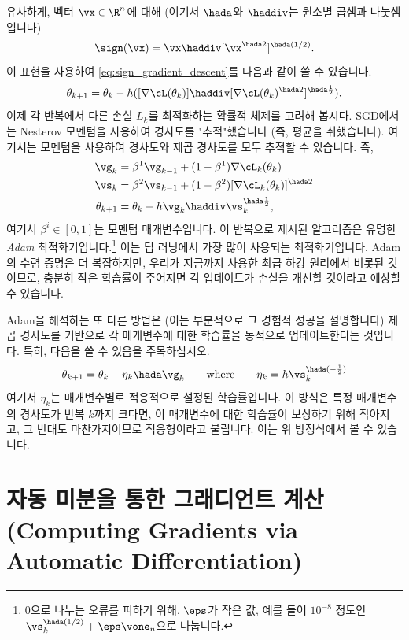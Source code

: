 \documentclass[../../book-main_ko.tex]{subfiles}
\begin{document}
유사하게, 벡터 \(\vx \in \R^{n}\)에 대해 (여기서 \(\hada\)와 \(\haddiv\)는 원소별 곱셈과 나눗셈입니다)
\begin{equation}
    \sign(\vx) = \vx \haddiv [\vx^{\hada 2}]^{\hada (1/2)}.
\end{equation}
이 표현을 사용하여 \eqref{eq:sign_gradient_descent}를 다음과 같이 쓸 수 있습니다.
\begin{equation}
    \theta_{k + 1} = \theta_{k} - h ([\nabla \cL(\theta_{k})] \haddiv [\nabla
    \cL(\theta_{k})^{\hada 2}]^{\hada \frac{1}{2}}).
\end{equation}
이제 각 반복에서 다른 손실 \(L_{k}\)를 최적화하는 확률적 체제를 고려해 봅시다. SGD에서는 Nesterov 모멘텀을 사용하여 경사도를 "추적"했습니다 (즉, 평균을 취했습니다). 여기서는 모멘텀을 사용하여 경사도와 제곱 경사도를 모두 추적할 수 있습니다. 즉,
\begin{align}
    \vg_{k}
    &= \beta^{1}\vg_{k - 1} + (1 - \beta^{1})\nabla \cL_{k}(\theta_{k}) \\ 
    \vs_{k}
    &= \beta^{2}\vs_{k - 1} + (1 - \beta^{2})[\nabla \cL_{k}(\theta_{k})]^{\hada 2}  \\
    \theta_{k + 1}
    &= \theta_{k} - h\vg_{k}\haddiv\vs_{k}^{\hada \frac{1}{2}},
\end{align}
여기서 \(\beta^{i} \in [0, 1]\)는 모멘텀 매개변수입니다. 이 반복으로 제시된 알고리즘은 유명한 \textit{Adam} 최적화기입니다.\footnote{0으로 나누는 오류를 피하기 위해, \(\eps\)가 작은 값, 예를 들어 \(10^{-8}\) 정도인 \(\vs_{k}^{\hada (1/2)} + \eps \vone_{n}\)으로 나눕니다.} 이는 딥 러닝에서 가장 많이 사용되는 최적화기입니다. Adam의 수렴 증명은 더 복잡하지만, 우리가 지금까지 사용한 최급 하강 원리에서 비롯된 것이므로, 충분히 작은 학습률이 주어지면 각 업데이트가 손실을 개선할 것이라고 예상할 수 있습니다.

Adam을 해석하는 또 다른 방법은 (이는 부분적으로 그 경험적 성공을 설명합니다) 제곱 경사도를 기반으로 각 매개변수에 대한 학습률을 동적으로 업데이트한다는 것입니다. 특히, 다음을 쓸 수 있음을 주목하십시오.
\begin{equation}
    \theta_{k + 1} = \theta_{k} - \eta_{k} \hada \vg_{k} \qquad \text{where}
    \qquad \eta_{k} = h \vs_{k}^{\hada (-\frac{1}{2})}
\end{equation}
여기서 \(\eta_{k}\)는 매개변수별로 적응적으로 설정된 학습률입니다. 이 방식은 특정 매개변수의 경사도가 반복 \(k\)까지 크다면, 이 매개변수에 대한 학습률이 보상하기 위해 작아지고, 그 반대도 마찬가지이므로 적응형이라고 불립니다. 이는 위 방정식에서 볼 수 있습니다.

\section{자동 미분을 통한 그래디언트 계산 (Computing Gradients via Automatic Differentiation)}\label{sec:autodiff}
\end{document}
